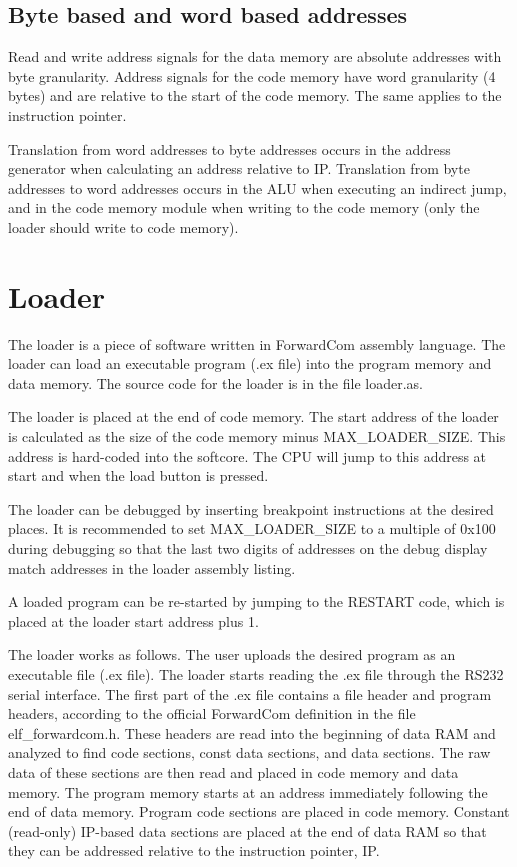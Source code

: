 \documentclass[11pt,a4paper,oneside,openright]{report}
\newcommand{\vv}{ \vspace{2mm} }   %
\begin{document}
\subsection{Byte based and word based addresses}
Read and write address signals for the data memory are absolute addresses with byte granularity. Address signals for the code memory have word granularity (4 bytes) and are relative to the start of the code memory. The same applies to the instruction pointer.
\vv

Translation from word addresses to byte addresses occurs in the address generator when calculating an address relative to IP. Translation from byte addresses to word addresses occurs in the ALU when executing an indirect jump, and in the code memory module when writing to the code memory (only the loader should write to code memory).
\vv


\section{Loader} \label{Chap:Loader}
The loader is a piece of software written in ForwardCom assembly language. The loader can load an executable program (.ex file) into the program memory and data memory. The source code for the loader is in the file loader.as. 
\vv

The loader is placed at the end of code memory. The start address of the loader is calculated as the size of the code memory minus MAX\_LOADER\_SIZE. This address is hard-coded into the softcore. The CPU will jump to this address at start and when the load button is pressed. 
\vv

The loader can be debugged by inserting breakpoint instructions at the desired places. It is recommended to set  MAX\_LOADER\_SIZE to a multiple of 0x100 during debugging so that the last two digits of addresses on the debug display match addresses in the loader assembly listing.
\vv

A loaded program can be re-started by jumping to the RESTART code, which is placed at the loader start address plus 1.
\vv

The loader works as follows. The user uploads the desired program as an executable file (.ex file). The loader starts reading the .ex file through the RS232 serial interface. The first part of the .ex file contains a file header and program headers, according to the official ForwardCom definition in the file elf\_forwardcom.h. These headers are read into the beginning of data RAM and analyzed to find code sections, const data sections, and data sections. The raw data of these sections are then read and placed in code memory and data memory. The program memory starts at an address immediately following the end of data memory. Program code sections are placed in code memory. 
Constant (read-only) IP-based data sections are placed at the end of data RAM so that they can be addressed relative to the instruction pointer, IP.
\vv
\end{document}
